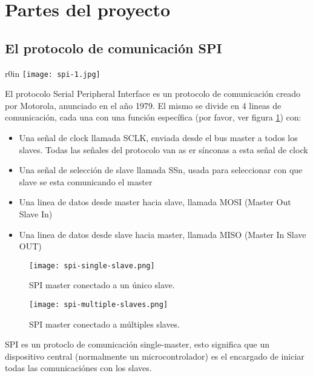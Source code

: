 \documentclass[../informe_krapp.tex]{subfiles}
\begin{document}
\section{Partes del proyecto}
\subsection{El protocolo de comunicación SPI}
\begin{wrapfigure}{r}{0in}
	\centering
	\texttt{[image: spi-1.jpg]}
\end{wrapfigure}

El protocolo Serial Peripheral Interface es un protocolo de comunicación creado por
Motorola, anunciado en el año 1979.
El mismo se divide en 4 lineas de comunicación, cada una con una función específica
(por favor, ver figura \ref{spi-single-slave}) con:

\begin{itemize}
	\item Una señal de clock llamada SCLK, enviada desde el bus master a todos los slaves.
	      Todas las señales del protocolo van as er sínconas a esta señal de clock
	\item Una señal de selección de slave llamada SSn, usada para seleccionar con
	      que slave se esta comunicando el master
	\item Una linea de datos desde master hacia slave, llamada MOSI (Master Out Slave In)
	\item Una linea de datos desde slave hacia master, llamada MISO (Master In Slave OUT)
\end{itemize}

\begin{figure}[H]
	\centering
	\texttt{[image: spi-single-slave.png]}
	\caption{SPI master conectado a un único slave.}
	\label{spi-single-slave}
\end{figure}

\begin{figure}[H]
	\centering
	\texttt{[image: spi-multiple-slaves.png]}
	\caption{SPI master conectado a múltiples slaves.}
	\label{spi-multiple-slaves}
\end{figure}


\clearpage


SPI es un protoclo de comunicación single-master, esto significa que un dispositivo
central (normalmente un microcontrolador) es el encargado de iniciar todas
las comunicaciónes con los slaves.
\end{document}
